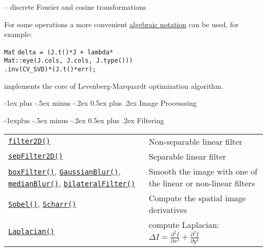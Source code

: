 \documentclass[10pt,landscape]{article}
\makeatletter
\renewcommand{\section}{\@startsection{section}{1}{0mm}%
                                {-1ex plus -.5ex minus -.2ex}%
                                {0.5ex plus .2ex}%
                                {\normalfont\large\bfseries}}
\renewcommand{\subsection}{\@startsection{subsection}{2}{0mm}%
                                {-1explus -.5ex minus -.2ex}%
                                {0.5ex plus .2ex}%
                                {\normalfont\normalsize\bfseries}}
\makeatother
\begin{document}
\begin{multicols}{3}
\begin{itemize}
-- discrete Fourier and cosine transformations 

\end{itemize}

For some operations a more convenient \href{http://opencv.willowgarage.com/documentation/cpp/basic_structures.html#matrix-expressions}{algebraic notation} can be used, for example:
\begin{tabbing}
\texttt{Mat}\={} \texttt{delta = (J.t()*J + lambda*}\\
\>\texttt{Mat::eye(J.cols, J.cols, J.type()))}\\
\>\texttt{.inv(CV\_SVD)*(J.t()*err);}
\end{tabbing}
implements the core of Levenberg-Marquardt optimization algorithm.

\section{Image Processsing}

\subsection{Filtering}

\begin{tabular}{@{}p{\the\MyLen}%
                @{}p{\linewidth-\the\MyLen}@{}}
\texttt{\href{http://opencv.willowgarage.com/documentation/cpp/image_filtering.html\#cv-filter2d}{filter2D()}} & Non-separable linear filter \\

\texttt{\href{http://opencv.willowgarage.com/documentation/cpp/image_filtering.html\#cv-sepfilter2d}{sepFilter2D()}} & Separable linear filter \\

\texttt{\href{http://opencv.willowgarage.com/documentation/cpp/image_filtering.html\#cv-blur}{boxFilter()}},  \texttt{\href{http://opencv.willowgarage.com/documentation/cpp/image_filtering.html\#cv-gaussianblur}{GaussianBlur()}},
\texttt{\href{http://opencv.willowgarage.com/documentation/cpp/image_filtering.html\#cv-medianblur}{medianBlur()}},
\texttt{\href{http://opencv.willowgarage.com/documentation/cpp/image_filtering.html\#cv-bilateralfilter}{bilateralFilter()}}
& Smooth the image with one of the linear or non-linear filters \\

\texttt{\href{http://opencv.willowgarage.com/documentation/cpp/image_filtering.html\#cv-sobel}{Sobel()}},  \texttt{\href{http://opencv.willowgarage.com/documentation/cpp/image_filtering.html\#cv-scharr}{Scharr()}}
& Compute the spatial image derivatives \\
\texttt{\href{http://opencv.willowgarage.com/documentation/cpp/image_filtering.html\#cv-laplacian}{Laplacian()}} & compute Laplacian: $\Delta I = \frac{\partial ^ 2 I}{\partial x^2} + \frac{\partial ^ 2 I}{\partial y^2}$  \\


\end{tabular}
\end{multicols}
\end{document}
